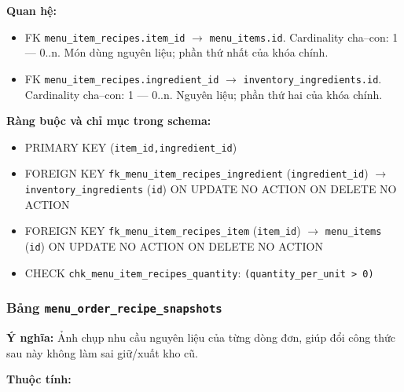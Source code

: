 \textbf{Quan hệ:}

\begin{itemize}

\item FK \texttt{menu\_item\_recipes.item\_id} $\rightarrow$ \texttt{menu\_items.id}. Cardinality cha--con: 1 — 0..n. Món dùng nguyên liệu; phần thứ nhất của khóa chính.

\item FK \texttt{menu\_item\_recipes.ingredient\_id} $\rightarrow$ \texttt{inventory\_ingredients.id}. Cardinality cha--con: 1 — 0..n. Nguyên liệu; phần thứ hai của khóa chính.

\end{itemize}

\textbf{Ràng buộc và chỉ mục trong schema:}

\begin{itemize}

\item PRIMARY KEY (\texttt{item\_id,ingredient\_id})

\item FOREIGN KEY \texttt{fk\_menu\_item\_recipes\_ingredient} (\texttt{ingredient\_id}) $\rightarrow$ \texttt{inventory\_ingredients} (\texttt{id}) ON UPDATE NO ACTION ON DELETE NO ACTION

\item FOREIGN KEY \texttt{fk\_menu\_item\_recipes\_item} (\texttt{item\_id}) $\rightarrow$ \texttt{menu\_items} (\texttt{id}) ON UPDATE NO ACTION ON DELETE NO ACTION

\item CHECK \texttt{chk\_menu\_item\_recipes\_quantity}: \texttt{(quantity\_per\_unit > 0)}

\end{itemize}

\subsubsection{Bảng \texttt{menu\_order\_recipe\_snapshots}}

\textbf{Ý nghĩa:} Ảnh chụp nhu cầu nguyên liệu của từng dòng đơn, giúp đổi công thức sau này không làm sai giữ/xuất kho cũ.\par

\textbf{Thuộc tính:}

